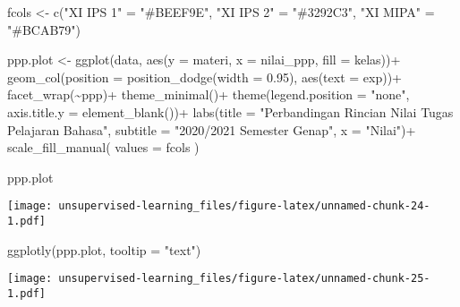 \documentclass[
]{article}
\newenvironment{Shaded}{\begin{snugshade}}{\end{snugshade}}
\newcommand{\AttributeTok}[1]{\textcolor[rgb]{0.77,0.63,0.00}{#1}}
\newcommand{\FloatTok}[1]{\textcolor[rgb]{0.00,0.00,0.81}{#1}}
\newcommand{\FunctionTok}[1]{\textcolor[rgb]{0.00,0.00,0.00}{#1}}
\newcommand{\NormalTok}[1]{#1}
\newcommand{\OtherTok}[1]{\textcolor[rgb]{0.56,0.35,0.01}{#1}}
\newcommand{\SpecialCharTok}[1]{\textcolor[rgb]{0.00,0.00,0.00}{#1}}
\newcommand{\StringTok}[1]{\textcolor[rgb]{0.31,0.60,0.02}{#1}}
\begin{document}
\begin{Shaded}
\begin{Highlighting}[]
\NormalTok{fcols }\OtherTok{\textless{}{-}} \FunctionTok{c}\NormalTok{(}\StringTok{"XI IPS 1"} \OtherTok{=} \StringTok{"\#BEEF9E"}\NormalTok{, }
           \StringTok{"XI IPS 2"} \OtherTok{=} \StringTok{"\#3292C3"}\NormalTok{,}
           \StringTok{"XI MIPA"} \OtherTok{=} \StringTok{"\#BCAB79"}\NormalTok{)}

\NormalTok{ppp.plot }\OtherTok{\textless{}{-}} \FunctionTok{ggplot}\NormalTok{(data, }\FunctionTok{aes}\NormalTok{(}\AttributeTok{y =}\NormalTok{ materi, }
                 \AttributeTok{x =}\NormalTok{ nilai\_ppp, }
                 \AttributeTok{fill =}\NormalTok{ kelas))}\SpecialCharTok{+}
  \FunctionTok{geom\_col}\NormalTok{(}\AttributeTok{position =} \FunctionTok{position\_dodge}\NormalTok{(}\AttributeTok{width =} \FloatTok{0.95}\NormalTok{),}
           \FunctionTok{aes}\NormalTok{(}\AttributeTok{text =}\NormalTok{ exp))}\SpecialCharTok{+}
  \FunctionTok{facet\_wrap}\NormalTok{(}\SpecialCharTok{\textasciitilde{}}\NormalTok{ppp)}\SpecialCharTok{+}
  \FunctionTok{theme\_minimal}\NormalTok{()}\SpecialCharTok{+}
  \FunctionTok{theme}\NormalTok{(}\AttributeTok{legend.position =} \StringTok{"none"}\NormalTok{,}
        \AttributeTok{axis.title.y =} \FunctionTok{element\_blank}\NormalTok{())}\SpecialCharTok{+}
  \FunctionTok{labs}\NormalTok{(}\AttributeTok{title =} \StringTok{"Perbandingan Rincian Nilai Tugas Pelajaran Bahasa"}\NormalTok{,}
       \AttributeTok{subtitle =} \StringTok{"2020/2021 Semester Genap"}\NormalTok{,}
       \AttributeTok{x =} \StringTok{"Nilai"}\NormalTok{)}\SpecialCharTok{+}
  \FunctionTok{scale\_fill\_manual}\NormalTok{(}
    \AttributeTok{values =}\NormalTok{ fcols      }
\NormalTok{  )}

\NormalTok{ppp.plot}
\end{Highlighting}
\end{Shaded}

\texttt{[image: unsupervised-learning\_files/figure-latex/unnamed-chunk-24-1.pdf]}

\begin{Shaded}
\begin{Highlighting}[]
\FunctionTok{ggplotly}\NormalTok{(ppp.plot, }\AttributeTok{tooltip =} \StringTok{"text"}\NormalTok{)}
\end{Highlighting}
\end{Shaded}

\texttt{[image: unsupervised-learning\_files/figure-latex/unnamed-chunk-25-1.pdf]}
\end{document}
